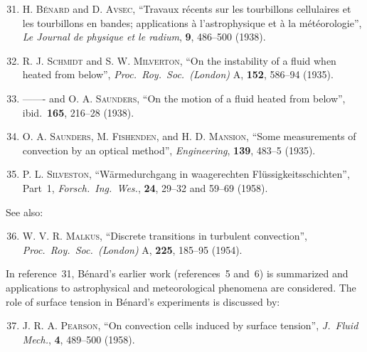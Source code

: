 \begin{enumerate}
\setcounter{enumi}{30}

\item \textsc{H. B\'enard} and \textsc{D. Avsec}, ``Travaux r\'ecents sur les tourbillons cellulaires
  et les tourbillons en bandes; applications \`a l'astrophysique et \`a la m\'et\'eorologie'',
  \textit{Le Journal de physique et le radium}, \textbf{9}, 486--500 (1938).

\item \textsc{R. J. Schmidt} and \textsc{S. W. Milverton}, ``On the instability of a fluid when
  heated from below'', \textit{Proc.\ Roy.\ Soc.\ (London)} A, \textbf{152}, 586--94
  (1935).

\item ------- and \textsc{O. A. Saunders}, ``On the motion of a fluid heated from below'',
  ibid.\ \textbf{165}, 216--28 (1938).

\item \textsc{O. A. Saunders}, \textsc{M. Fishenden}, and \textsc{H. D. Mansion}, ``Some measurements
  of convection by an optical method'', \textit{Engineering}, \textbf{139}, 483--5 (1935).

\item \textsc{P. L. Silveston}, ``W\"armedurchgang in waagerechten Fl\"ussigkeitsschichten'',
  Part~1, \textit{Forsch.\ Ing.\ Wes.}, \textbf{24}, 29--32 and 59--69 (1958).

\end{enumerate}

\noindent See also:

\begin{enumerate}
\setcounter{enumi}{35}

\item \textsc{W. V. R. Malkus}, ``Discrete transitions in turbulent convection'',
  \textit{Proc.\ Roy.\ Soc.\ (London)} A, \textbf{225}, 185--95 (1954).

\end{enumerate}

\noindent In reference~31, B\'enard's earlier work (references~5 and~6) is summarized and
applications to astrophysical and meteorological phenomena are considered. The
role of surface tension in B\'enard's experiments is discussed by:

\begin{enumerate}
\setcounter{enumi}{36}

\item \textsc{J. R. A. Pearson}, ``On convection cells induced by surface tension'',
  \textit{J.\ Fluid Mech.}, \textbf{4}, 489--500 (1958).

\end{enumerate}

